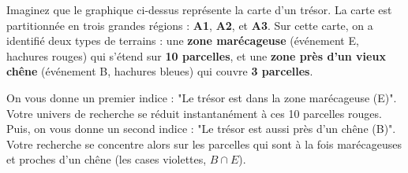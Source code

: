 \begin{intuitionbox}
\begin{center}
\end{center}
Imaginez que le graphique ci-dessus représente la carte d'un trésor. La carte est partitionnée en trois grandes régions : \textbf{A1}, \textbf{A2}, et \textbf{A3}. Sur cette carte, on a identifié deux types de terrains : une \textbf{zone marécageuse} (événement E, hachures rouges) qui s'étend sur \textbf{10 parcelles}, et une \textbf{zone près d'un vieux chêne} (événement B, hachures bleues) qui couvre \textbf{3 parcelles}.

On vous donne un premier indice : "Le trésor est dans la zone marécageuse (E)". Votre univers de recherche se réduit instantanément à ces 10 parcelles rouges. Puis, on vous donne un second indice : "Le trésor est aussi près d'un chêne (B)". Votre recherche se concentre alors sur les parcelles qui sont à la fois marécageuses et proches d'un chêne (les cases violettes, $B \cap E$).


\end{intuitionbox}
